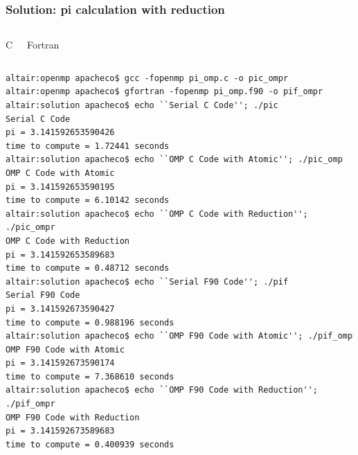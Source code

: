 \documentclass[c,mathserif,compress,xcolor=svgnames]{beamer}
\newenvironment{bblock}[0]
{
\begin{beamerboxesrounded}[upper=uppercol1,lower=lowercol1,shadow=true]}
{\end{beamerboxesrounded}}
\newenvironment{eblock}[0]
{
\begin{beamerboxesrounded}[upper=uppercol2,lower=lowercol2,shadow=true]}
{\end{beamerboxesrounded}}
\begin{document}
\begin{frame}
  \frametitle{\small Solution: pi calculation with reduction}
  \begin{columns}
    \column{5cm}
    \begin{eblock}{C }
      
    \end{eblock}
    \column{5cm}
    \begin{eblock}{Fortran}
      
    \end{eblock}
  \end{columns}
  \begin{bblock}{}
    {\tiny
      \begin{verbatim}
altair:openmp apacheco$ gcc -fopenmp pi_omp.c -o pic_ompr
altair:openmp apacheco$ gfortran -fopenmp pi_omp.f90 -o pif_ompr
altair:solution apacheco$ echo ``Serial C Code''; ./pic
Serial C Code
pi = 3.141592653590426
time to compute = 1.72441 seconds
altair:solution apacheco$ echo ``OMP C Code with Atomic''; ./pic_omp
OMP C Code with Atomic
pi = 3.141592653590195
time to compute = 6.10142 seconds
altair:solution apacheco$ echo ``OMP C Code with Reduction''; ./pic_ompr
OMP C Code with Reduction
pi = 3.141592653589683
time to compute = 0.48712 seconds
altair:solution apacheco$ echo ``Serial F90 Code''; ./pif
Serial F90 Code
pi = 3.141592673590427
time to compute = 0.988196 seconds
altair:solution apacheco$ echo ``OMP F90 Code with Atomic''; ./pif_omp
OMP F90 Code with Atomic
pi = 3.141592673590174
time to compute = 7.368610 seconds
altair:solution apacheco$ echo ``OMP F90 Code with Reduction''; ./pif_ompr
OMP F90 Code with Reduction
pi = 3.141592673589683
time to compute = 0.400939 seconds
      \end{verbatim}
    }
  \end{bblock}
\end{frame}
\end{document}
